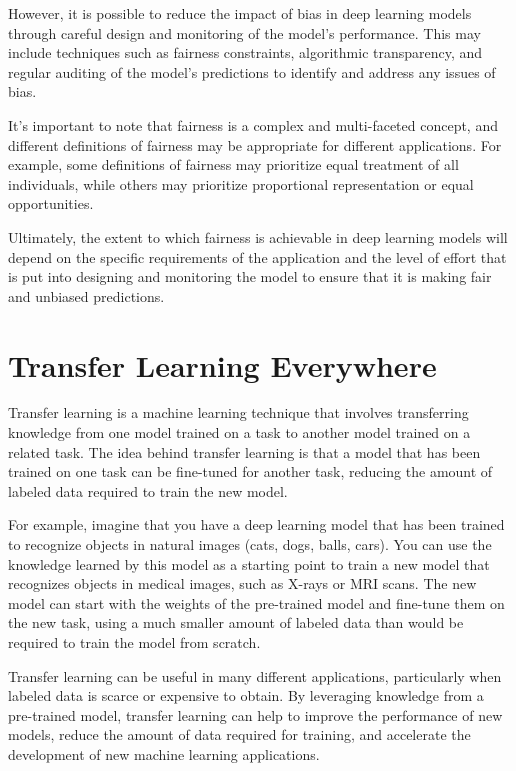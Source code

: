 However, it is possible to reduce the impact of bias in deep learning models through careful design and monitoring of the model's performance. This may include techniques such as fairness constraints, algorithmic transparency, and regular auditing of the model's predictions to identify and address any issues of bias.

It's important to note that fairness is a complex and multi-faceted concept, and different definitions of fairness may be appropriate for different applications. For example, some definitions of fairness may prioritize equal treatment of all individuals, while others may prioritize proportional representation or equal opportunities.

Ultimately, the extent to which fairness is achievable in deep learning models will depend on the specific requirements of the application and the level of effort that is put into designing and monitoring the model to ensure that it is making fair and unbiased predictions.

\section{Transfer Learning Everywhere}

Transfer learning is a machine learning technique that involves transferring knowledge from one model trained on a task to another model trained on a related task. The idea behind transfer learning is that a model that has been trained on one task can be fine-tuned for another task, reducing the amount of labeled data required to train the new model.

For example, imagine that you have a deep learning model that has been trained to recognize objects in natural images (cats, dogs, balls, cars). You can use the knowledge learned by this model as a starting point to train a new model that recognizes objects in medical images, such as X-rays or MRI scans. The new model can start with the weights of the pre-trained model and fine-tune them on the new task, using a much smaller amount of labeled data than would be required to train the model from scratch.

Transfer learning can be useful in many different applications, particularly when labeled data is scarce or expensive to obtain. By leveraging knowledge from a pre-trained model, transfer learning can help to improve the performance of new models, reduce the amount of data required for training, and accelerate the development of new machine learning applications.

